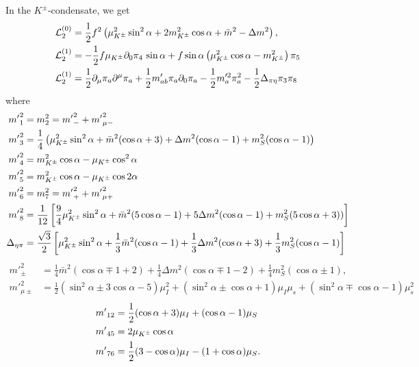 In the $K^\pm$-condensate, we get
%
\begin{align}
    \label{static three-flavor lagrangian kaon condensate}
    \mathcal{L}^{(0)}_2 
    & =
    \frac{1}{2}f^2 
    \left(
        \mu_{K^\pm}^2 \sin^2\alpha
        + 2m^2_{K^\pm} \cos\alpha
        + \bar m^2 - \Delta m^2
    \right), \\
    \label{linear three-flavor lagrangian kaon condensate}
    \mathcal{L}_2^{(1)}
    & 
    =
    - \frac{1}{2}f\mu_{K^\pm}\partial_0\pi_4 \, \sin\alpha 
    + f\sin\alpha
    \left(
        \mu_{K^\pm}^2 \cos\alpha
        -m_{K^\pm}^2
    \right)\pi_5\\
    \label{quadratic three-flavor lagrangian kaon condensate}
    \mathcal{L}_2^{(1)}
    & =
    \frac{1}{2} \partial_\mu \pi_a \partial^\mu \pi_a
    + \frac{1}{2}m'_{ab} \pi_a\partial_0\pi_a
    - \frac{1}{2}m'^2_{a} \pi_a^2
    - \frac{1}{2}\Delta_{\pi\eta} \pi_3\pi_8
\end{align}
%
where
%
\begin{align}
    {m'}_1^2 & = m_2^2 = {m'}_-^2 + {m'}_{\mu-}^2\\
    {m'}_3^2 
    & = 
    \frac{1}{4}
    \left(
        \mu_{K^\pm}^2 \sin^2\alpha
        + \bar m^2(\cos\alpha + 3)
        + \Delta m^2 (\cos\alpha -1)
        + m_S^2(\cos\alpha - 1)
    \right)\\
    {m'}_4^2 & = m_{K^\pm}^2\cos\alpha -\mu_{K^\pm} \cos^2\alpha \\
    {m'}_5^2 & = m_{K^\pm}^2\cos\alpha -\mu_{K^\pm} \cos 2\alpha \\
    {m'}_6^2 & = m_7^2 = {m'}_+^2 + {m'}_{\mu+}^2\\
    {m'}_8^2
    & =
    \frac{1}{12}
    \left[
        \frac{9}{4}\mu_{K^\pm}^2\sin^2\alpha
        + \bar m^2(5\cos\alpha-1) 
        + 5\Delta m^2(\cos\alpha-1)
        + m_S^2(5\cos\alpha+3))
    \right] \\
    \Delta_{\eta\pi}
    & =
    \frac{\sqrt{3}}{2}
    \left[
        \mu_{K^\pm}^2\sin^2\alpha
        + \frac{1}{3}\bar m^2(\cos\alpha - 1)
        + \frac{1}{3}\Delta m^2(\cos\alpha + 3)
        + \frac{1}{3}m^2_S(\cos\alpha - 1)
    \right]
\end{align}
%
\begin{align}
    {m'}_\pm^2
    & =
    \frac{1}{4}\bar m^2 (\cos\alpha \mp 1 + 2)
    + \frac{1}{4} \Delta m^2 (\cos\alpha \mp 1-2)
    +\frac{1}{4} m_S^2 (\cos\alpha \pm 1), \\
    {m'}_{\mu\pm}^2
    & =
    \frac{1}{2}(\sin^2\alpha  \pm 3\cos\alpha - 5)\mu_I^2
    +(\sin^2\alpha\pm\cos\alpha + 1)\mu_I\mu_s
    +(\sin^2\alpha\mp\cos\alpha - 1)\mu_s^2
\end{align}
%
\begin{align}
    {m'}_{12} &= \frac{1}{2}(\cos\alpha + 3)\mu_I + (\cos\alpha - 1)\mu_S \\
    {m'}_{45} &= 2\mu_{K^\pm}\cos\alpha \\
    {m'}_{76} &= \frac{1}{2}(3-\cos\alpha) \mu_I - (1 + \cos\alpha)\mu_S.
\end{align}

